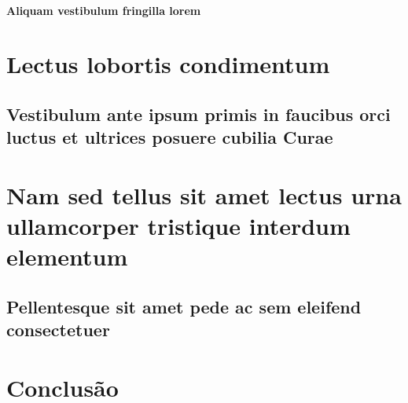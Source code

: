 \documentclass[
	12pt,				%
	openright,			%
	twoside,			%
	a4paper,			%
	tcc,			%
	]{ABNT-CCT-UENP}
\begin{document}
\lipsum[2]

\subsubsection{Aliquam vestibulum fringilla lorem}

\lipsum[3]


\chapter{Lectus lobortis condimentum}

\section{Vestibulum ante ipsum primis in faucibus orci luctus et ultrices
posuere cubilia Curae}

\lipsum[21-22]


\chapter{Nam sed tellus sit amet lectus urna ullamcorper tristique interdum
elementum}

\section{Pellentesque sit amet pede ac sem eleifend consectetuer}

\lipsum[24]


\chapter{Conclusão}

\lipsum[31-33]

\postextual





%
%
\end{document}
